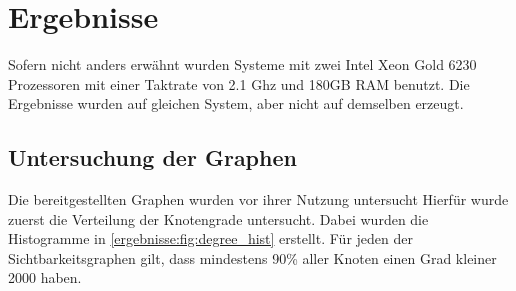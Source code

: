 \chapter{Ergebnisse}

Sofern nicht anders erwähnt wurden Systeme mit zwei Intel Xeon Gold 6230 Prozessoren mit einer Taktrate von 2.1 Ghz und 180GB RAM benutzt.
Die Ergebnisse wurden auf gleichen System, aber nicht auf demselben erzeugt.

\section{Untersuchung der Graphen}

Die bereitgestellten Graphen wurden vor ihrer Nutzung untersucht
Hierfür wurde zuerst die Verteilung der Knotengrade untersucht.
Dabei wurden die Histogramme in \autoref{ergebnisse:fig:degree_hist} erstellt.
Für jeden der Sichtbarkeitsgraphen gilt, dass mindestens 90\% aller Knoten einen Grad kleiner \num{2000} haben.

